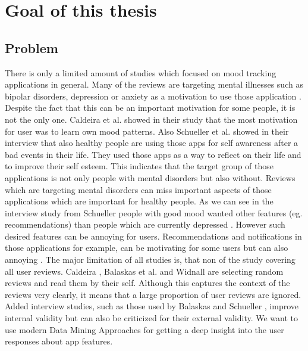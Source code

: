 \chapter{Goal of this thesis}
\label{ch:goal}
\section{Problem}
\label{sec:problem}

There is only a limited amount of studies which focused on mood tracking applications in general.
Many of the reviews are targeting mental illnesses such as bipolar disorders, depression or anxiety as a motivation to use those application \cite{nicholas2015mobile}\cite{Balaskas2022UnderstandingUP}.
Despite the fact that this can be an important motivation for some people, it is not the only one.
Caldeira et al. \cite{caldeira2017mobile} showed in their study that the most motivation for user was to learn own mood patterns. Also Schueller et al. \cite{schueller2021understanding} showed in their interview that also healthy people are using those apps for self awareness after a bad events in their life.
They used those apps as a way to reflect on their life and to improve their self esteem.
This indicates that the target group of those applications is not only people with mental disorders but also without.
Reviews which are targeting mental disorders can miss important aspects of those applications which are important for healthy people.
As we can see in the interview study from Schueller people with good mood wanted other features (eg. recommendations) than people which are currently depressed \cite{schueller2021understanding}. However such desired features can be annoying for users. Recommendations and notifications in those applications for example, can be motivating for some users\cite{widnall2020user} but can also annoying \cite{Balaskas2022UnderstandingUP}.
The major limitation of all studies is, that non of the study covering all user reviews. 
Caldeira \cite{caldeira2017mobile}, Balaskas et al. \cite{Balaskas2022UnderstandingUP} and Widnall \cite{widnall2020user} are selecting random reviews and read them by their self. 
Although this captures the context of the reviews very clearly, it means that a large proportion of user reviews are ignored. 
Added interview studies, such as those used by Balaskas \cite{Balaskas2022UnderstandingUP} and Schueller \cite{Balaskas2022UnderstandingUP}, improve internal validity but can also be criticized for their external validity.
We want to use modern Data Mining Approaches for getting a deep insight into the user responses about app features.

